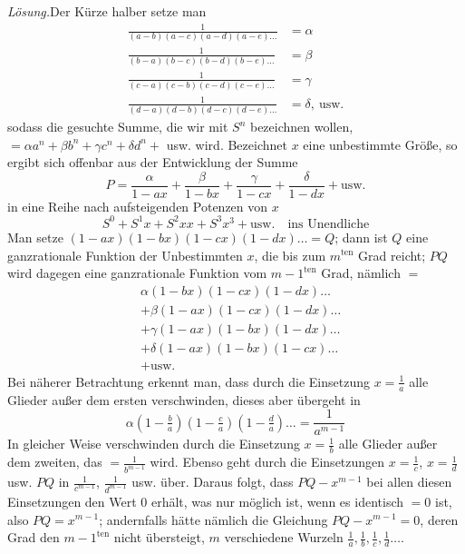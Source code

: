 \textit{Lösung.}\quad Der Kürze halber setze man
\[
\begin{aligned}
\frac1{(a-b)(a-c)(a-d)(a-e)\ldots}&=\alpha\\
\frac1{(b-a)(b-c)(b-d)(b-e)\ldots}&=\beta\\
\frac1{(c-a)(c-b)(c-d)(c-e)\ldots}&=\gamma\\
\frac1{(d-a)(d-b)(d-c)(d-e)\ldots}&=\delta,\ \text{usw.}
\end{aligned}
\]
sodass die gesuchte Summe, die wir mit $S^n$ bezeichnen wollen, $=\alpha a^n+\beta b^n+\gamma c^n+\delta d^n+$ usw. wird. Bezeichnet $x$ eine unbestimmte Größe, so ergibt sich offenbar aus der Entwicklung der Summe
\[
P=\frac\alpha{1-ax}+\frac\beta{1-bx}+\frac\gamma{1-cx}+\frac\delta{1-dx}+\text{usw.}
\]
in eine Reihe nach aufsteigenden Potenzen von $x$
\[
S^0+S^1x+S^2xx+S^3x^3+\text{usw.}\quad\text{ins Unendliche}
\]
Man setze $(1-ax)(1-bx)(1-cx)(1-dx)\ldots=Q$; dann ist $Q$ eine ganzrationale Funktion der Unbestimmten $x$, die bis zum $m^{\mathrm{ten}}$ Grad reicht; $PQ$ wird dagegen eine ganzrationale Funktion vom $m-1^{\mathrm{ten}}$ Grad, nämlich $=$
\[
\begin{aligned}
&\alpha(1-bx)(1-cx)(1-dx)\ldots\\
&+\beta(1-ax)(1-cx)(1-dx)\ldots\\
&+\gamma(1-ax)(1-bx)(1-dx)\ldots\\
&+\delta(1-ax)(1-bx)(1-cx)\ldots\\
&+\text{usw.}
\end{aligned}
\]
Bei näherer Betrachtung erkennt man, dass durch die Einsetzung $x=\frac1a$ alle Glieder außer dem ersten verschwinden, dieses aber übergeht in
\[
\alpha(1-\tfrac ba)(1-\tfrac ca)(1-\tfrac da)\ldots=\frac1{a^{m-1}}
\]
In gleicher Weise verschwinden durch die Einsetzung $x=\frac1b$ alle Glieder außer dem zweiten, das $=\frac1{b^{m-1}}$ wird. Ebenso geht durch die Einsetzungen $x=\frac1c$, $x=\frac1d$ usw. $PQ$ in $\frac1{c^{m-1}}$, $\frac1{d^{m-1}}$ usw. über. Daraus folgt, dass $PQ-x^{m-1}$ bei allen diesen Einsetzungen den Wert 0 erhält, was nur möglich ist, wenn es identisch $=0$ ist, also $PQ=x^{m-1}$; andernfalls hätte nämlich die Gleichung $PQ-x^{m-1}=0$, deren Grad den $m-1^{\mathrm{ten}}$ nicht übersteigt, $m$ verschiedene Wurzeln $\frac1a,\frac1b,\frac1c,\frac1d\ldots$.


